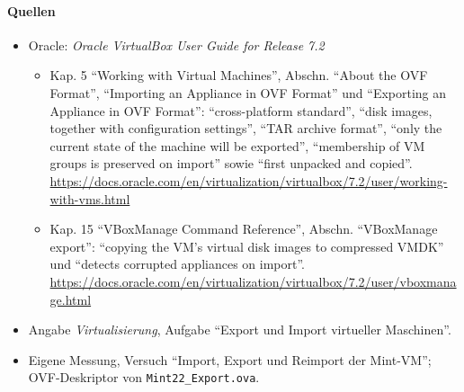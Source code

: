 \paragraph{Quellen}
\begin{itemize}[quellen]
  \item Oracle: \emph{Oracle VirtualBox User Guide for Release 7.2}
  \begin{itemize}[nosep]
    \item Kap. 5 \enquote{Working with Virtual Machines}, Abschn. \enquote{About the OVF Format}, \enquote{Importing an Appliance in OVF Format} und \enquote{Exporting an Appliance in OVF Format}: \enquote{cross-platform standard}, \enquote{disk images, together with configuration settings}, \enquote{TAR archive format}, \enquote{only the current state of the machine will be exported}, \enquote{membership of VM groups is preserved on import} sowie \enquote{first unpacked and copied}. \url{https://docs.oracle.com/en/virtualization/virtualbox/7.2/user/working-with-vms.html}
    \item Kap. 15 \enquote{VBoxManage Command Reference}, Abschn. \enquote{VBoxManage export}: \enquote{copying the VM's virtual disk images to compressed VMDK} und \enquote{detects corrupted appliances on import}. \url{https://docs.oracle.com/en/virtualization/virtualbox/7.2/user/vboxmanage.html}
  \end{itemize}
  \item Angabe \emph{Virtualisierung}, Aufgabe \enquote{Export und Import virtueller Maschinen}.
  \item Eigene Messung, Versuch \enquote{Import, Export und Reimport der Mint-VM}; OVF-Deskriptor von \nolinkurl{Mint22_Export.ova}.
\end{itemize}
